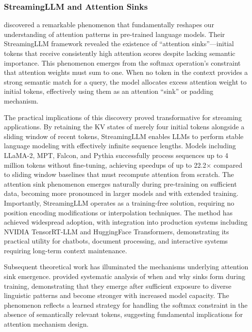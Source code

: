 \subsubsection{StreamingLLM and Attention Sinks}

\citet{xiao2024streamingllm} discovered a remarkable phenomenon that fundamentally reshapes our understanding of attention patterns in pre-trained language models. Their StreamingLLM framework revealed the existence of ``attention sinks''---initial tokens that receive consistently high attention scores despite lacking semantic importance. This phenomenon emerges from the softmax operation's constraint that attention weights must sum to one. When no token in the context provides a strong semantic match for a query, the model allocates excess attention weight to initial tokens, effectively using them as an attention ``sink'' or padding mechanism.

The practical implications of this discovery proved transformative for streaming applications. By retaining the KV states of merely four initial tokens alongside a sliding window of recent tokens, StreamingLLM enables LLMs to perform stable language modeling with effectively infinite sequence lengths. Models including LLaMA-2, MPT, Falcon, and Pythia successfully process sequences up to 4 million tokens without fine-tuning, achieving speedups of up to 22.2$\times$ compared to sliding window baselines that must recompute attention from scratch. The attention sink phenomenon emerges naturally during pre-training on sufficient data, becoming more pronounced in larger models and with extended training. Importantly, StreamingLLM operates as a training-free solution, requiring no position encoding modifications or interpolation techniques. The method has achieved widespread adoption, with integration into production systems including NVIDIA TensorRT-LLM and HuggingFace Transformers, demonstrating its practical utility for chatbots, document processing, and interactive systems requiring long-term context maintenance.

Subsequent theoretical work has illuminated the mechanisms underlying attention sink emergence. \citet{wu2025whenattentionsinkemerges} provided systematic analysis of when and why sinks form during training, demonstrating that they emerge after sufficient exposure to diverse linguistic patterns and become stronger with increased model capacity. The phenomenon reflects a learned strategy for handling the softmax constraint in the absence of semantically relevant tokens, suggesting fundamental implications for attention mechanism design.

